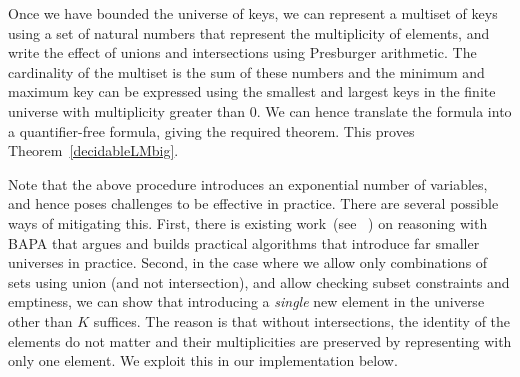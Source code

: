 Once we have bounded the universe of keys, we can represent a multiset of keys using a set of natural numbers
that represent the multiplicity of elements, and write the effect of unions and intersections
using Presburger arithmetic. The cardinality of the multiset is the sum of these numbers
and the minimum and maximum key can be expressed using the smallest and largest keys in the finite universe
with multiplicity greater than $0$. 
We can hence translate the formula into a quantifier-free formula, 
giving the required theorem.
This proves Theorem~\ref{decidableLMbig}.

Note that the above procedure introduces an exponential number of variables, and hence poses challenges
to be effective in practice. There are several possible ways of mitigating this. 
First, there is existing work~(see ~\cite{BAPA2}) on reasoning with BAPA that argues and builds practical 
algorithms that introduce far smaller universes in practice. Second, in the case where we allow only
combinations of sets using union (and not intersection), and allow checking subset constraints and emptiness,
we can show that introducing a \emph{single} new element in the universe other than $K$ suffices. 
The reason
is that without intersections, the identity of the elements do not matter and their multiplicities
are preserved by representing with only one element. We exploit this in our implementation below. 